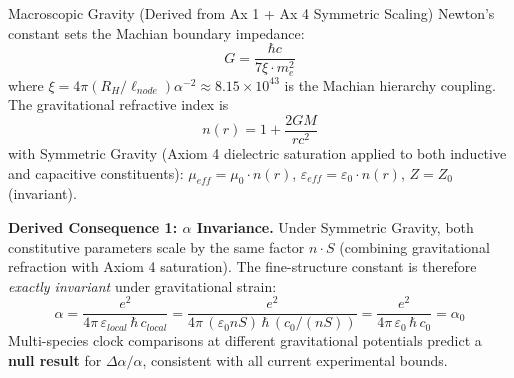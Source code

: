 %
%
\begin{resultbox}{Macroscopic Gravity (Derived from Ax 1 + Ax 4 Symmetric Scaling)}
Newton's constant sets the Machian boundary impedance:
\begin{equation}
    G = \frac{\hbar c}{7\xi \cdot m_e^2}
    \label{eq:gravity_newton}
\end{equation}
where $\xi = 4\pi(R_H / \ell_{node})\alpha^{-2} \approx 8.15 \times 10^{43}$ is the Machian hierarchy coupling.
The gravitational refractive index is
\begin{equation}
    n(r) = 1 + \frac{2GM}{rc^2}
    \label{eq:gravity_refraction}
\end{equation}
with Symmetric Gravity (Axiom 4 dielectric saturation applied to both inductive and capacitive constituents):
$\mu_{eff} = \mu_0 \cdot n(r)$,\;
$\varepsilon_{eff} = \varepsilon_0 \cdot n(r)$,\;
$Z = Z_0$ (invariant).
\end{resultbox}

\noindent\textbf{Derived Consequence 1: $\alpha$ Invariance.}
Under Symmetric Gravity, both constitutive parameters scale by the same factor $n \cdot S$
(combining gravitational refraction with Axiom 4 saturation). The fine-structure constant is therefore
\textit{exactly invariant} under gravitational strain:
\begin{equation}
    \alpha = \frac{e^2}{4\pi\,\varepsilon_{local}\,\hbar\,c_{local}}
           = \frac{e^2}{4\pi\,(\varepsilon_0 n S)\,\hbar\,(c_0/(nS))}
           = \frac{e^2}{4\pi\,\varepsilon_0\,\hbar\,c_0}
           = \alpha_0
    \label{eq:alpha_invariance}
\end{equation}
Multi-species clock comparisons at different gravitational potentials predict a
\textbf{null result} for $\Delta\alpha/\alpha$, consistent with all current experimental bounds.

